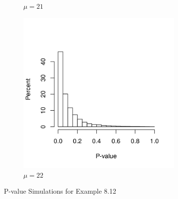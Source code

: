\begin{figure}[ht]
\begin{subfigure}[b]{0.5\linewidth}
            \caption{$\mu=21$}
        \end{subfigure}\hfill
        \begin{subfigure}[b]{0.5\linewidth}
            \centering
            \includegraphics[width=0.9\textwidth]{figures/part6c.png} %
            \caption{$\mu=22$}
        \end{subfigure}
        \caption{P-value Simulations for Example 8.12}
    \end{figure} \label{fig:part6}
